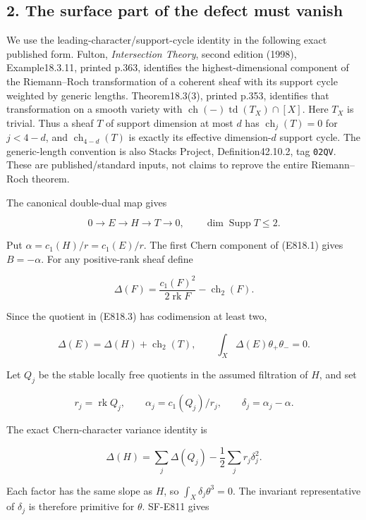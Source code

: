 \subsection{2. The surface part of the defect must
vanish}\label{SF-E818-the-surface-part-of-the-defect-must-vanish}

We use the leading-character/support-cycle identity in the following
exact published form. Fulton, \emph{Intersection Theory}, second edition
(1998), Example18.3.11, printed p.363, identifies the
highest-dimensional component of the Riemann--Roch transformation of a
coherent sheaf with its support cycle weighted by generic lengths.
Theorem18.3(3), printed p.353, identifies that transformation on a
smooth variety with
\(\operatorname{ch}(-)\operatorname{td}(T_X)\cap[X]\). Here \(T_X\) is
trivial. Thus a sheaf \(T\) of support dimension at most \(d\) has
\(\operatorname{ch}_j(T)=0\) for \(j<4-d\), and
\(\operatorname{ch}_{4-d}(T)\) is exactly its effective dimension-\(d\)
support cycle. The generic-length convention is also Stacks Project,
Definition42.10.2, tag \texttt{02QV}. These are published/standard
inputs, not claims to reprove the entire Riemann--Roch theorem.

The canonical double-dual map gives

\[
 0\longrightarrow E\longrightarrow H\longrightarrow T\longrightarrow0,
 \qquad \dim\operatorname{Supp}T\le2.
 \tag{E818.3}
\]

Put \(\alpha=c_1(H)/r=c_1(E)/r\). The first Chern component of (E818.1)
gives \(B=-\alpha\). For any positive-rank sheaf define

\[
 \Delta(F)=\frac{c_1(F)^2}{2\operatorname{rk}F}-\operatorname{ch}_2(F).
\]

Since the quotient in (E818.3) has codimension at least two,

\[
 \Delta(E)=\Delta(H)+\operatorname{ch}_2(T),
 \qquad
 \int_X\Delta(E)\theta_+\theta_-=0.
 \tag{E818.4}
\]

Let \(Q_j\) be the stable locally free quotients in the assumed
filtration of \(H\), and set

\[
 r_j=\operatorname{rk}Q_j,\qquad
 \alpha_j=c_1(Q_j)/r_j,\qquad \delta_j=\alpha_j-\alpha.
\]

The exact Chern-character variance identity is

\[
 \Delta(H)=\sum_j\Delta(Q_j)-\frac12\sum_jr_j\delta_j^2.
 \tag{E818.5}
\]

Each factor has the same slope as \(H\), so
\(\int_X\delta_j\theta^3=0\). The invariant representative of
\(\delta_j\) is therefore primitive for \(\theta\). SF-E811 gives

